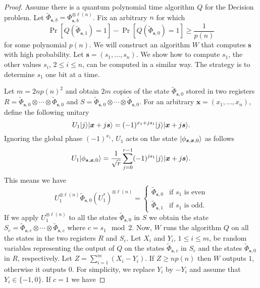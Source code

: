 \documentclass[11pt]{article}
\theoremstyle{plain}
\theoremstyle{definition}
\DeclarePairedDelimiter{\ldbrac}{\lvert}{\rangle}
\begin{document}
\begin{proof}
    Assume there is a quantum polynomial time algorithm $Q$ for the Decision problem. Let $\tilde{\Phi}_{\bm{s}, b} = \Phi_{\bm{s}, b}^{\otimes \ell(n)}$. Fix an arbitrary $n$ for which 
    \[ \Pr[ Q(\tilde{\Phi}_{\bm{s}, 1}) = 1 ] - \Pr[ Q(\tilde{\Phi}_{\bm{s}, 0}) = 1 ] \ge \frac{1}{p(n)} \]
    for some polynomial $p(n)$. We will construct an algorithm $W$ that computes $\bm{s}$ with high probability. Let $\bm{s} = (s_1, \dots, s_n)$. We show how to compute $s_1$, the other values $s_i$, $2 \le i \le n$, can be computed in a similar way. The strategy is to determine $s_1$ one bit at a time.

    Let $m = 2np(n)^2$ and obtain $2m$ copies of the state $\tilde{\Phi}_{\bm{s}, 0}$ stored in two registers $R = \tilde{\Phi}_{\bm{s}, 0} \otimes \cdots \otimes \tilde{\Phi}_{\bm{s}, 0}$ and $S = \tilde{\Phi}_{\bm{s}, 0} \otimes \cdots \otimes \tilde{\Phi}_{\bm{s}, 0}$. For an arbitrary $\bm{x} = (x_1, \dots, x_n)$, define the following unitary
    \[ U_1 \ldbrac{j}\ldbrac{\bm{x} + j\bm{s}} = (-1)^{x_1 + js_1} \ldbrac{j}\ldbrac{\bm{x} + j\bm{s}}. \]
    Ignoring the global phase $(-1)^{x_1}$, $U_1$ acts on the state $\ldbrac{\phi_{\bm{s}, \bm{x}, 0}}$ as follows
    \[ U_1 \ldbrac{\phi_{\bm{s}, \bm{x}, 0}} = \frac{1}{\sqrt{r}} \sum_{j = 0}^{r - 1} (-1)^{js_1}\ldbrac{j}\ldbrac{\bm{x} + j\bm{s}}. \]
    This means we have
    \begin{equation}
        \label{equ:u1}
        U_1^{\otimes \ell(n)} \tilde{\Phi}_{\bm{s}, 0} (U_1^*)^{\otimes \ell(n)} =
        \begin{cases}
            \tilde{\Phi}_{\bm{s}, 0} & \text{if } s_1 \text{ is even} \\
            \tilde{\Phi}_{\bm{s}, 1} & \text{if } s_1 \text{ is odd}.
        \end{cases}
    \end{equation}
    If we apply $U_1^{\otimes \ell(n)}$ to all the states $\tilde{\Phi}_{\bm{s}, 0}$ in $S$ we obtain the state $S_c = \tilde{\Phi}_{\bm{s}, c} \otimes \cdots \otimes \tilde{\Phi}_{\bm{s}, c}$ where $c = s_1 \mod 2$. Now, $W$ runs the algorithm $Q$ on all the states in the two registers $R$ and $S_c$. Let $X_i$ and $Y_i$, $1 \le i \le m$, be random variables representing the output of $Q$ on the states $\tilde{\Phi}_{\bm{s}, c}$ in $S_c$ and the states $\tilde{\Phi}_{\bm{s}, 0}$ in $R$, respectively. Let $Z = \sum_{i = 1}^m (X_i - Y_i)$. If $Z \ge np(n)$ then $W$ outputs $1$, otherwise it outputs $0$. For simplicity, we replace $Y_i$ by $-Y_i$ and assume that $Y_i \in \{ -1, 0 \}$. If $c = 1$ we have

\end{proof}
\end{document}
